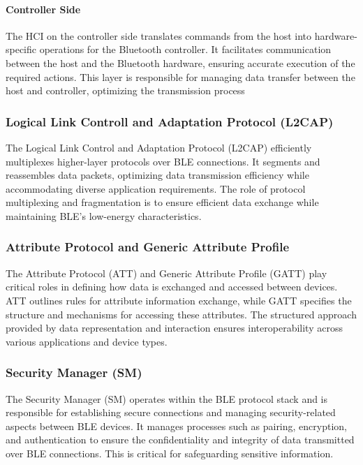 \paragraph{Controller Side}
The HCI on the controller side translates commands from the host into hardware-specific operations for the Bluetooth controller. It facilitates communication between the host and the Bluetooth hardware, ensuring accurate execution of the required actions. This layer is responsible for managing data transfer between the host and controller, optimizing the transmission process


\subsubsection{Logical Link Controll and Adaptation Protocol (L2CAP)}
The Logical Link Control and Adaptation Protocol (L2CAP) efficiently multiplexes higher-layer protocols over BLE connections. It segments and reassembles data packets, optimizing data transmission efficiency while accommodating diverse application requirements. The role of protocol multiplexing and fragmentation is to ensure efficient data exchange while maintaining BLE's low-energy characteristics.

\subsubsection{Attribute Protocol and Generic Attribute Profile}
The Attribute Protocol (ATT) and Generic Attribute Profile (GATT) play critical roles in defining how data is exchanged and accessed between devices. ATT outlines rules for attribute information exchange, while GATT specifies the structure and mechanisms for accessing these attributes. The structured approach provided by data representation and interaction ensures interoperability across various applications and device types.

\subsubsection{Security Manager (SM)}
The Security Manager (SM) operates within the BLE protocol stack and is responsible for establishing secure connections and managing security-related aspects between BLE devices. It manages processes such as pairing, encryption, and authentication to ensure the confidentiality and integrity of data transmitted over BLE connections. This is critical for safeguarding sensitive information.

